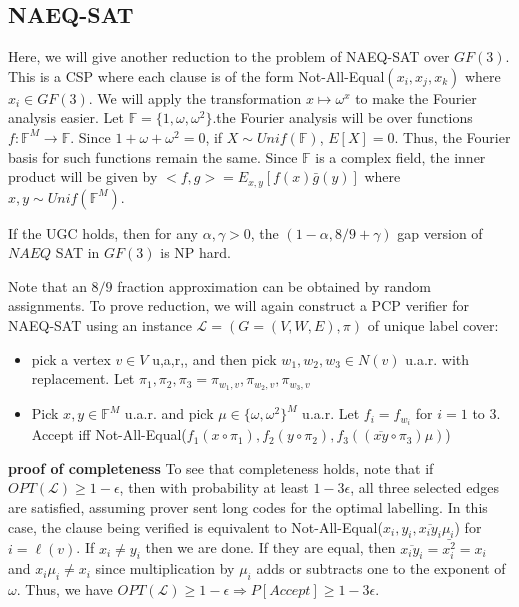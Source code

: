 \documentclass{article}
\newcommand{\1}{\mathbbm{1}}
\newcommand{\om}{\omega}
\newcommand{\F}{\mathbb{F}}
\begin{document}
\subsection*{NAEQ-SAT}
Here, we will give another reduction to the problem of NAEQ-SAT over $GF(3)$. This is a CSP where each clause is of the form Not-All-Equal$(x_i, x_j, x_k)$ where $x_i \in GF(3)$. We will apply the transformation $x\mapsto \omega^x$ to make the Fourier analysis easier. Let $\F = \{1,\om,\om^2\}$.the Fourier analysis will be over functions $f:\F^M\rightarrow \F$. Since $1+\om+\om^2 = 0$, if $X\sim Unif(\F)$, $E[X] = 0$. Thus, the Fourier basis for such functions remain the same. Since $\F$ is a complex field, the inner product will be given by $<f,g> = E_{x,y}[f(x)\bar{g}(y)]$ where $x,y\sim Unif(\F^M)$. 
\begin{theorem}
If the UGC holds, then for any $\alpha, \gamma > 0$, the $(1-\alpha, 8/9+\gamma)$ gap version of $NAEQ$ SAT in $GF(3)$ is NP hard. 
\end{theorem}
Note that an $8/9$ fraction approximation can be obtained by random assignments. To prove reduction, we will again construct a PCP verifier for NAEQ-SAT using an instance $\mathcal{L} = (G=(V,W,E), \pi)$ of unique label cover:
\begin{itemize}
    \item pick a vertex $v\in V$ u,a,r,, and then pick $w_1, w_2, w_3\in N(v)$ u.a.r. with replacement. Let $\pi_1,\pi_2,\pi_3 = \pi_{w_1, v}, \pi_{w_2,v}, \pi_{w_3,v}$
    \item Pick $x,y \in \F^M$ u.a.r. and pick $\mu \in \{\om, \om^2\}^M$ u.a.r. Let $f_i = f_{w_i}$ for $i=1$ to $3$. Accept iff Not-All-Equal($f_1(x\circ \pi_1), f_2(y\circ\pi_2), f_3((\overline{xy}\circ \pi_3)\mu)$)
\end{itemize} 
\textbf{proof of completeness} To see that completeness holds, note that if $OPT(\mathcal{L})\geq 1-\epsilon$, then with probability at least $1-3\epsilon$, all three selected edges are satisfied, assuming prover sent long codes for the optimal labelling. In this case, the clause being verified is equivalent to Not-All-Equal($x_i, y_i, \overline{x_iy_i}\mu_{i}$) for $i = \ell(v)$. If $x_i\neq y_i$ then we are done. If they are equal, then $\overline{x_iy_i} = \bar{x_i^2} = x_i$ and $x_i\mu_i\neq x_i$ since multiplication by $\mu_i$ adds or subtracts one to the exponent of $\om$. Thus, we have $OPT(\mathcal{L}) \geq 1-\epsilon \Rightarrow P[Accept] \geq 1-3\epsilon$.\\\\
\end{document}
